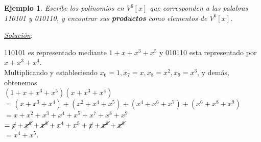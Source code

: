 \documentclass{beamer}
\theoremstyle{plain}
\theoremstyle{example}
\theoremstyle{example}
\newtheorem{ejemplo} [Ejemplo] {Ejemplo}
\begin{document}
\begin{frame}  \small  

\begin{ejemplo}

Escribe los polinomios en $V^6[x]$ que corresponden a las palabras 110101 y 010110, y encontrar sus \textbf{productos} como elementos de $V^6[x]$.
\end{ejemplo}
\textit{\underline{Solución}}:\\
\vspace*{5pt}

110101 es representado mediante $1 + x + x^3 + x^5$ y 010110 esta representado por $x+x^3 +x^4$. \\

Multiplicando y estableciendo $x_6=1, x_7=x, x_8=x^2, x_9=x^3$, y demás, obtenemos\\

\vspace*{5pt}
$(1+x+x^3 +x^5)(x+x^3 +x^4)$\\
$= (x+x^3 +x^4)+(x^2 +x^4 +x^5)+(x^4 +x^6 +x^7)+(x^6 +x^8 +x^9)$\\
$= x+x^2 +x^3 +x^4 +x^5 +x^7 +x^8 +x^9$\\
$= \cancel{x}+\cancel{x^2}+\cancel{x^3} +x^4 +x^5+\cancel{x}+ \cancel{x^2}+\cancel{x^3}$\\ 
$= x^4 +x^5.$\\


\end{frame} 
\end{document}
